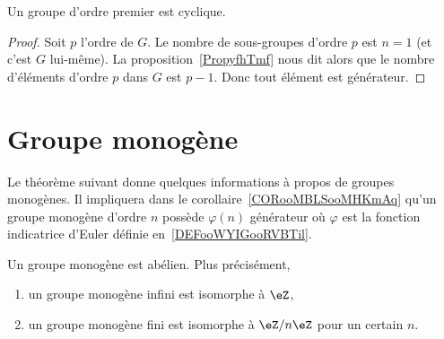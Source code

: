 \begin{corollary}
    Un groupe d'ordre premier est cyclique.
\end{corollary}

\begin{proof}
    Soit \( p\) l'ordre de \( G\). Le nombre de sous-groupes d'ordre \( p\) est \( n=1\) (et c'est \( G\) lui-même). La proposition~\ref{PropyfhTmf} nous dit alors que le nombre d'éléments d'ordre \( p\) dans \( G\) est \( p-1\). Donc tout élément est générateur.
\end{proof}


\section{Groupe monogène}

Le théorème suivant donne quelques informations à propos de groupes monogènes. Il impliquera dans le corollaire~\ref{CORooMBLSooMHKmAq} qu'un groupe monogène d'ordre \( n\) possède \( \varphi(n)\) générateur où \( \varphi\) est la fonction indicatrice d'Euler définie en~\ref{DEFooWYIGooRVBTil}.

\begin{theorem}     \label{THOooDOMZooOEYHAe}
    Un groupe monogène est abélien. Plus précisément,
    \begin{enumerate}
        \item
            un groupe monogène infini est isomorphe à \( \eZ\),
        \item
            un groupe monogène fini est isomorphe à \( \eZ/n\eZ\) pour un certain \( n\).
    \end{enumerate}
\end{theorem}

